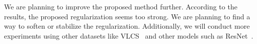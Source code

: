 We are planning to improve the proposed method further. According to the results, the proposed regularization seems too strong. We are planning to find a way to soften or stabilize the regularization. Additionally, we will conduct more experiments using other datasets like VLCS~\cite{chen2013vlcs} and other models such as ResNet~\cite{He2016resnet}.